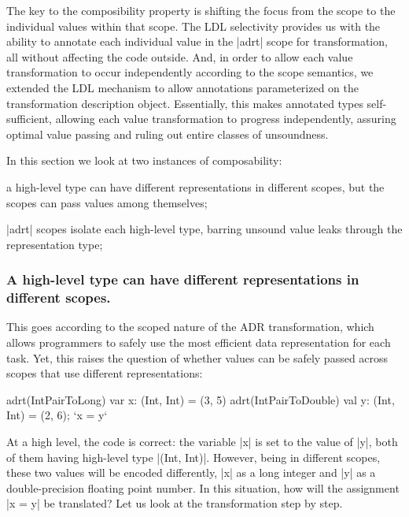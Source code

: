 The key to the composibility property is shifting the focus from the scope to the individual values within that scope. The LDL selectivity provides us with the ability to annotate each individual value in the |adrt| scope for transformation, all without affecting the code outside. And, in order to allow each value transformation to occur independently according to the scope semantics, we extended the LDL mechanism to allow annotations parameterized on the transformation description object. Essentially, this makes annotated types self-sufficient, allowing each value transformation to progress independently, assuring optimal value passing and ruling out entire classes of unsoundness.

In this section we look at two instances of composability:

\begin{compactitem}
  \item a high-level type can have different representations in different scopes, but the scopes can pass values among themselves;
  \item |adrt| scopes isolate each high-level type, barring unsound value leaks through the representation type;
\end{compactitem}

\subsubsection{A high-level type can have different representations in different scopes.} This goes according to the scoped nature of the ADR transformation, which allows programmers to safely use the most efficient data representation for each task. Yet, this raises the question of whether values can be safely passed across scopes that use different representations:

\begin{lstlisting-nobreak}
adrt(IntPairToLong)   { var x: (Int, Int) = (3, 5) }
adrt(IntPairToDouble) { val y: (Int, Int) = (2, 6); `x = y` }
\end{lstlisting-nobreak}

At a high level, the code is correct: the variable |x| is set to the value of |y|, both of them having high-level type |(Int, Int)|. However, being in different scopes, these two values will be encoded differently, |x| as a long integer and |y| as a double-precision floating point number. In this situation, how will the assignment |x = y| be translated? Let us look at the transformation step by step.

